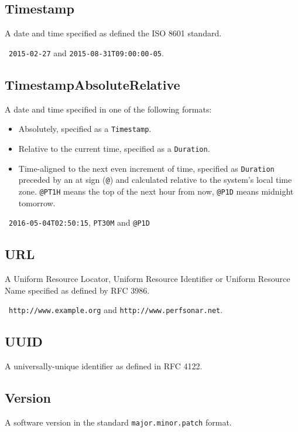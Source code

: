 \documentclass[10pt]{article}
\begin{document}
\subsection{Timestamp}
A date and time specified as defined the ISO 8601 standard.

\example\ {\tt 2015-02-27} and {\tt 2015-08-31T09:00:00-05}.



\subsection{TimestampAbsoluteRelative}
A date and time specified in one of the following formats:
\begin{itemize}
\item Absolutely, specified as a {\tt Timestamp}.
\item Relative to the current time, specified as a {\tt Duration}.
\item Time-aligned to the next even increment of time, specified as
  {\tt Duration} preceded by an at sign ({\tt @}) and calculated
  relative to the system's local time zone.  {\tt @PT1H} means the top
  of the next hour from now, {\tt @P1D} means midnight tomorrow.
\end{itemize}

\example\ {\tt 2016-05-04T02:50:15}, {\tt PT30M} and {\tt @P1D}



\subsection{URL}
A Uniform Resource Locator, Uniform Resource Identifier or Uniform
Resource Name specified as defined by RFC 3986.

\example\ {\tt http://www.example.org} and {\tt http://www.perfsonar.net}.



\subsection{UUID}
A universally-unique identifier as defined in RFC 4122.



\subsection{Version}
A software version in the standard {\tt major.minor.patch} format.
\end{document}
